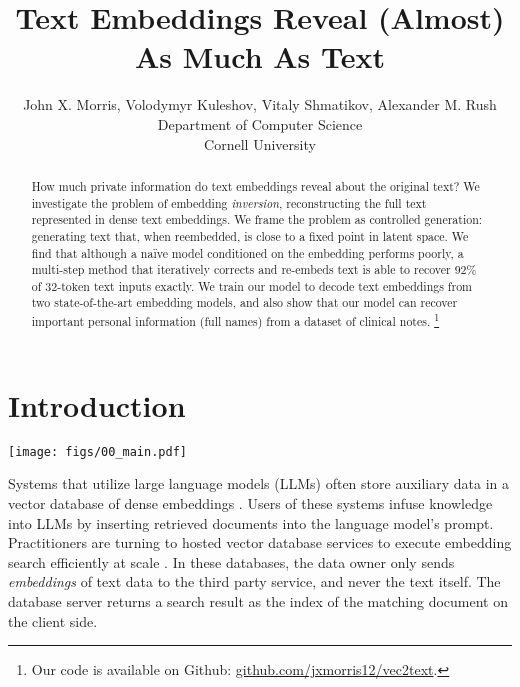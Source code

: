\documentclass[11pt]{article}
\title{Text Embeddings Reveal (Almost) As Much As Text}
\author{John X. Morris, Volodymyr Kuleshov, Vitaly Shmatikov, Alexander M. Rush \\
Department of Computer Science \\
Cornell University}
\newcommand{\MethodName}{Vec2Text}
\begin{document}
\maketitle

\begin{abstract}
How much private information do text embeddings reveal about the original text? We investigate the problem of embedding \textit{inversion}, reconstructing the full text represented in dense text embeddings. We frame the problem as controlled generation: generating text that, when reembedded, is close to a fixed point in latent space. We find that although a na\"ive model conditioned on the embedding performs poorly, a multi-step method that iteratively corrects and re-embeds text is able to recover $92\%$ of $32\text{-token}$ text inputs exactly. We train our model to decode text embeddings from two state-of-the-art embedding models, and also show that our model can recover important personal information (full names) from a dataset of clinical notes. \footnote{Our code is available on Github: \href{https://github.com/jxmorris12/vec2text}{github.com/jxmorris12/vec2text}.}
\end{abstract}

\section{Introduction}

\begin{figure*}[t]
    \centering
    \texttt{[image: figs/00\_main.pdf]}
    \caption{Overview of our method, \MethodName. Given access to a target embedding $e$ (blue) and query access to an embedding model $\phi$ (blue model), the system aims to iteratively generate (yellow model) hypotheses $\hat{e}$ (pink) to reach the target. Example input is a taken from a recent Wikipedia article (June 2023). \MethodName\ perfectly recovers this text from its embedding after $4$ rounds of correction.}
    \label{fig:00_main}
\end{figure*}

Systems that utilize large language models (LLMs) often store auxiliary data in a vector database of dense embeddings \cite{borgeaud2022improving, yao2023react}. Users of these systems infuse knowledge into LLMs by inserting retrieved documents into the language model's prompt. Practitioners are turning to hosted vector  database services to execute embedding search efficiently at scale \cite{vdb1Pinecone,vdb2qdrant,vdb3vdaas,vdb4weaviate,harrison2023langchain}.
In these databases, the data owner only sends \textit{embeddings} of text data \cite{le2014distributed,kiros2015skipthought} to the third party service, and never the text itself. The database server returns a search result as the index of the matching document on the client side.
\end{document}
